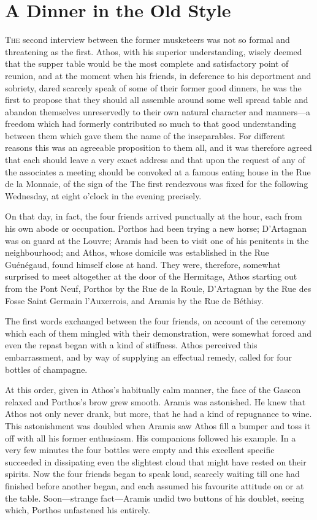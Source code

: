 \chapter{A Dinner in the Old Style}

 \lettrine{T}{he} second interview between the former musketeers was not so formal and threatening as the first. Athos, with his superior understanding, wisely deemed that the supper table would be the most complete and satisfactory point of reunion, and at the moment when his friends, in deference to his deportment and sobriety, dared scarcely speak of some of their former good dinners, he was the first to propose that they should all assemble around some well spread table and abandon themselves unreservedly to their own natural character and manners—a freedom which had formerly contributed so much to that good understanding between them which gave them the name of the inseparables. For different reasons this was an agreeable proposition to them all, and it was therefore agreed that each should leave a very exact address and that upon the request of any of the associates a meeting should be convoked at a famous eating house in the Rue de la Monnaie, of the sign of the  The first rendezvous was fixed for the following Wednesday, at eight o'clock in the evening precisely.

On that day, in fact, the four friends arrived punctually at the hour, each from his own abode or occupation. Porthos had been trying a new horse; D'Artagnan was on guard at the Louvre; Aramis had been to visit one of his penitents in the neighbourhood; and Athos, whose domicile was established in the Rue Guénégaud, found himself close at hand. They were, therefore, somewhat surprised to meet altogether at the door of the Hermitage, Athos starting out from the Pont Neuf, Porthos by the Rue de la Roule, D'Artagnan by the Rue des Fosse Saint Germain l'Auxerrois, and Aramis by the Rue de Béthisy.

The first words exchanged between the four friends, on account of the ceremony which each of them mingled with their demonstration, were somewhat forced and even the repast began with a kind of stiffness. Athos perceived this embarrassment, and by way of supplying an effectual remedy, called for four bottles of champagne.

At this order, given in Athos's habitually calm manner, the face of the Gascon relaxed and Porthos's brow grew smooth. Aramis was astonished. He knew that Athos not only never drank, but more, that he had a kind of repugnance to wine. This astonishment was doubled when Aramis saw Athos fill a bumper and toss it off with all his former enthusiasm. His companions followed his example. In a very few minutes the four bottles were empty and this excellent specific succeeded in dissipating even the slightest cloud that might have rested on their spirits. Now the four friends began to speak loud, scarcely waiting till one had finished before another began, and each assumed his favourite attitude on or at the table. Soon—strange fact—Aramis undid two buttons of his doublet, seeing which, Porthos unfastened his entirely.


